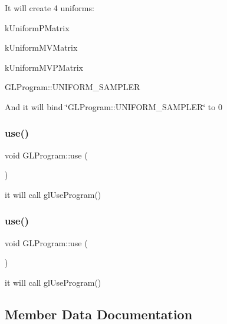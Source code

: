 It will create 4 uniforms\+:
\begin{DoxyItemize}
\item k\+Uniform\+P\+Matrix
\item k\+Uniform\+M\+V\+Matrix
\item k\+Uniform\+M\+V\+P\+Matrix
\item G\+L\+Program\+::\+U\+N\+I\+F\+O\+R\+M\+\_\+\+S\+A\+M\+P\+L\+ER
\end{DoxyItemize}

And it will bind \char`\"{}\+G\+L\+Program\+::\+U\+N\+I\+F\+O\+R\+M\+\_\+\+S\+A\+M\+P\+L\+E\+R\char`\"{} to 0 \mbox{\label{classGLProgram_a02d4c488d50f8e4235e6476d111b0890}} 
\subsubsection{\texorpdfstring{use()}{use()}\hspace{0.1cm}{\footnotesize\ttfamily [1/2]}}
{\footnotesize\ttfamily void G\+L\+Program\+::use (\begin{DoxyParamCaption}{ }\end{DoxyParamCaption})}

it will call gl\+Use\+Program() \mbox{\label{classGLProgram_a02d4c488d50f8e4235e6476d111b0890}} 
\subsubsection{\texorpdfstring{use()}{use()}\hspace{0.1cm}{\footnotesize\ttfamily [2/2]}}
{\footnotesize\ttfamily void G\+L\+Program\+::use (\begin{DoxyParamCaption}{ }\end{DoxyParamCaption})}

it will call gl\+Use\+Program() 

\subsection{Member Data Documentation}
\mbox{\label{classGLProgram_a8fe97273926c87df2cd0a5ae28d4dc14}} 
